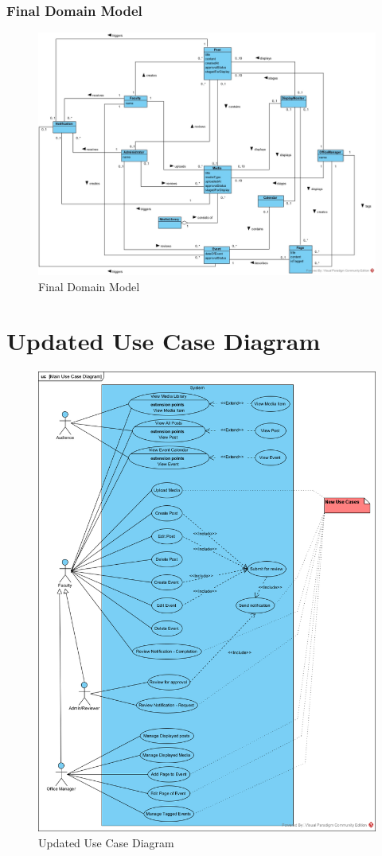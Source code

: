 \documentclass{article}
\begin{document}
\subsubsection{Final Domain Model}
\begin{figure}[H]
    \includegraphics[width=.9\textwidth]{images/DomainModel.jpg}
    \centering
    \caption{Final Domain Model}
    \label{fig:FinalDomain}
\end{figure}
\section{Updated Use Case Diagram}
\begin{figure}[H]
    \includegraphics[width=.88\textwidth]{updatedUseCaseDiagram.png}
    \centering
    \caption{Updated Use Case Diagram}
    \label{fig:updatedUseCaseDiagram}
\end{figure}
\end{document}
